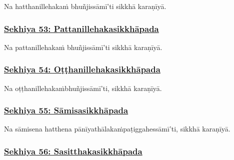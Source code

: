 Na hatthanillehakaṁ bhuñjissāmī'ti sikkhā karaṇīyā.



\subsubsection*{\hyperref[training53]{Sekhiya 53: Pattanillehakasikkhāpada}}
\label{sekh53}

Na pattanillehakaṁ bhuñjissāmī'ti sikkhā karaṇīyā.



\subsubsection*{\hyperref[training54]{Sekhiya 54: Oṭṭhanillehakasikkhāpada}}
\label{sekh54}

Na oṭṭhanillehakaṁ\makeatletter\hyperlink{endnote503-appendix}\makeatother \thinspace bhuñjissāmī'ti, sikkhā karaṇīyā.



\subsubsection*{\hyperref[training55]{Sekhiya 55: Sāmisasikkhāpada}}
\label{sekh55}

Na sāmisena hatthena pānīyathālakaṁ\makeatletter\hyperlink{endnote504-appendix}\makeatother \thinspace paṭiggahessāmī'ti, sikkhā karaṇīyā.



\subsubsection*{\hyperref[training56]{Sekhiya 56: Sasitthakasikkhāpada}}
\label{sekh56}


